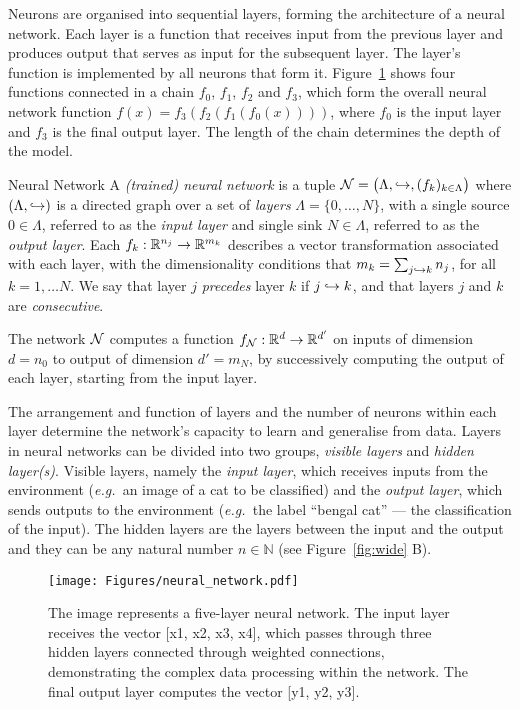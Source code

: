 Neurons are organised into sequential layers, forming the architecture of a neural network. Each layer is a function that receives input from the previous layer and produces output that serves as input for the subsequent layer. The layer's function is implemented by all neurons that form it. Figure~\ref{fig:neural} shows four functions connected in a chain $f_{0}$, $f_{1}$, $f_{2}$ and $f_{3}$, which form the overall neural network function $f(x) = f_{3}(f_{2}(f_{1}(f_{0}(x))))$, where $f_{0}$ is the input layer and $f_{3}$ is the final output layer. The length of the chain determines the depth of the model. 

\begin{Definition}{Neural Network}{}
A \emph{(trained) neural network} is a tuple $\mathcal{N}=\big(\Lambda,\hookrightarrow,(f_k)_{k\in \Lambda}\big)$ where $(\Lambda,\hookrightarrow)$ is a directed graph over a set of \emph{layers} $\Lambda=\{0,\dots, N\}$, with a single source $0\in \Lambda$, referred to as the \emph{input layer} and single sink $N\in \Lambda$, referred to as the \emph{output layer}. Each $f_k:\mathbb{R}^{n_j}\to \mathbb{R}^{m_k}$ describes a vector transformation associated with each layer, with the dimensionality conditions that $m_k=\sum_{j\hookrightarrow k} n_j$, for all $k=1,\dots N$.
%
We say that layer $j$ \emph{precedes} layer $k$ if $j\hookrightarrow k$, and that layers $j$ and $k$ are \emph{consecutive}.
\end{Definition}
The network $\mathcal{N}$ computes a function $f_{\mathcal{N}}:\mathbb{R}^{d}\to \mathbb{R}^{d'}$ on inputs of dimension $d=n_0$ to output of dimension $d'=m_N$, by successively computing the output of each layer, starting from the input layer. 

The arrangement and function of layers and the number of neurons within each layer determine the network's capacity to learn and generalise from data. Layers in neural networks can be divided into two groups, \textit{visible layers} and \textit{hidden layer(s)}. Visible layers, namely the \textit{input layer}, which receives inputs from the environment (\textit{e.g.\ }an image of a cat to be classified) and the \textit{output layer}, which sends outputs to the environment (\textit{e.g.\ }the label ``bengal cat'' --- the classification of the input). The hidden layers are the layers between the input and the output and they can be any natural number $n \in \mathbb{N}$ (see Figure~\ref{fig:wide} B). 

\begin{figure}[ht!]
	\begin{center}
		\texttt{[image: Figures/neural\_network.pdf]}
	\end{center}
	\caption{The image represents a five-layer neural network. The input layer receives the vector [x1, x2, x3, x4], which passes through three hidden layers connected through weighted connections, demonstrating the complex data processing within the network. The final output layer computes the vector [y1, y2, y3].}
	\label{fig:neural}
\end{figure} 

